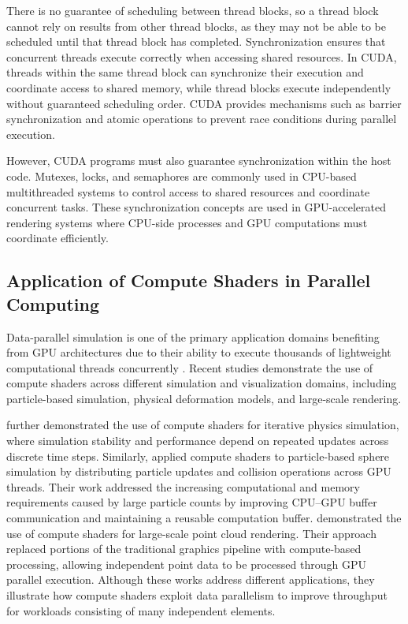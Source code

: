 There is no guarantee of scheduling between thread blocks, so a thread block cannot rely on results from other thread blocks, as they may not be able to be scheduled until that thread block has completed. Synchronization ensures that concurrent threads execute correctly when accessing shared resources. In CUDA, threads within the same thread block can synchronize their execution and coordinate access to shared memory, while thread blocks execute independently without guaranteed scheduling order. CUDA provides mechanisms such as barrier synchronization and atomic operations to prevent race conditions during parallel execution.

However, CUDA programs must also guarantee synchronization within the host code. Mutexes, locks, and semaphores are commonly used in CPU-based multithreaded systems to control access to shared resources and coordinate concurrent tasks. These synchronization concepts are used in GPU-accelerated rendering systems where CPU-side processes and GPU computations must coordinate efficiently. 

\subsection{Application of Compute Shaders in Parallel Computing}
Data-parallel simulation is one of the primary application domains benefiting from GPU architectures due to their ability to execute thousands of lightweight computational threads concurrently \cite{OwensJohnD.2008GC}. Recent studies demonstrate the use of compute shaders across different simulation and visualization domains, including particle-based simulation, physical deformation models, and large-scale rendering. 

\citeauthor{Va2021RealTimeCloth} further demonstrated the use of compute shaders for iterative physics simulation, where simulation stability and performance depend on repeated updates across discrete time steps. Similarly, \citeauthor{madera2022cpu} applied compute shaders to particle-based sphere simulation by distributing particle updates and collision operations across GPU threads. Their work addressed the increasing computational and memory requirements caused by large particle counts by improving CPU–GPU buffer communication and maintaining a reusable computation buffer. \citeauthor{schutz2021rendering} demonstrated the use of compute shaders for large-scale point cloud rendering. Their approach replaced portions of the traditional graphics pipeline with compute-based processing, allowing independent point data to be processed through GPU parallel execution. Although these works address different applications, they illustrate how compute shaders exploit data parallelism to improve throughput for workloads consisting of many independent elements.

